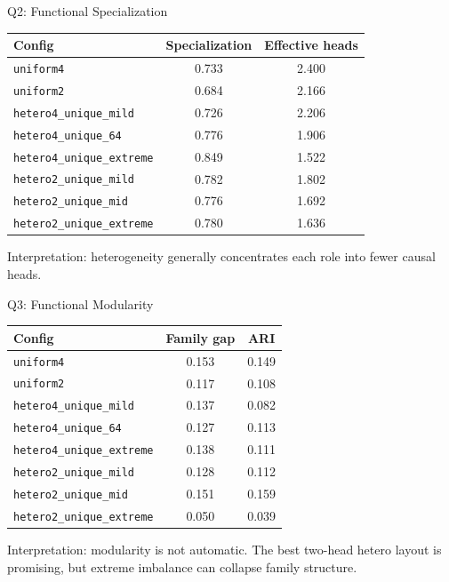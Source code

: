 \documentclass[aspectratio=169]{beamer}
\begin{document}
\begin{frame}{Q2: Functional Specialization}
  \scriptsize
  \begin{tabular}{lcc}
    \toprule
    Config & Specialization & Effective heads \\
    \midrule
    \texttt{uniform4} & 0.733 & 2.400 \\
    \texttt{uniform2} & 0.684 & 2.166 \\
    \texttt{hetero4\_unique\_mild} & 0.726 & 2.206 \\
    \texttt{hetero4\_unique\_64} & 0.776 & 1.906 \\
    \texttt{hetero4\_unique\_extreme} & 0.849 & 1.522 \\
    \texttt{hetero2\_unique\_mild} & 0.782 & 1.802 \\
    \texttt{hetero2\_unique\_mid} & 0.776 & 1.692 \\
    \texttt{hetero2\_unique\_extreme} & 0.780 & 1.636 \\
    \bottomrule
  \end{tabular}

  \vspace{0.35cm}
  Interpretation: heterogeneity generally concentrates each role into fewer causal heads.
\end{frame}

\begin{frame}{Q3: Functional Modularity}
  \scriptsize
  \begin{tabular}{lcc}
    \toprule
    Config & Family gap & ARI \\
    \midrule
    \texttt{uniform4} & 0.153 & 0.149 \\
    \texttt{uniform2} & 0.117 & 0.108 \\
    \texttt{hetero4\_unique\_mild} & 0.137 & 0.082 \\
    \texttt{hetero4\_unique\_64} & 0.127 & 0.113 \\
    \texttt{hetero4\_unique\_extreme} & 0.138 & 0.111 \\
    \texttt{hetero2\_unique\_mild} & 0.128 & 0.112 \\
    \texttt{hetero2\_unique\_mid} & 0.151 & 0.159 \\
    \texttt{hetero2\_unique\_extreme} & 0.050 & 0.039 \\
    \bottomrule
  \end{tabular}

  \vspace{0.35cm}
  Interpretation: modularity is not automatic. The best two-head hetero layout is promising, but extreme imbalance can collapse family structure.
\end{frame}
\end{document}
